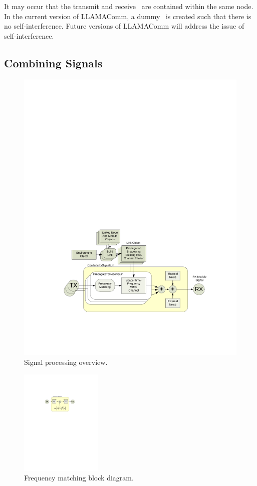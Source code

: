 It may occur that the transmit and receive \module\ are contained within the
same node. In the current version of LLAMAComm, a dummy \link\ is created such
that there is no self-interference. Future versions of LLAMAComm will address
the issue of self-interference.

\subsection{Combining Signals}\label{sec:combineSignal}

%
\begin{figure}[!h]
\centering
\includegraphics[width=6in]{"figs/Combine Rx"}
\caption{Signal processing overview.} \label{fig:combinerx}
\end{figure}
%
%
\begin{figure}[!h]
\centering
\includegraphics[height=2in]{"figs/Freq Match"}
\caption{Frequency matching block diagram.} \label{fig:freqmatch}
\end{figure}
